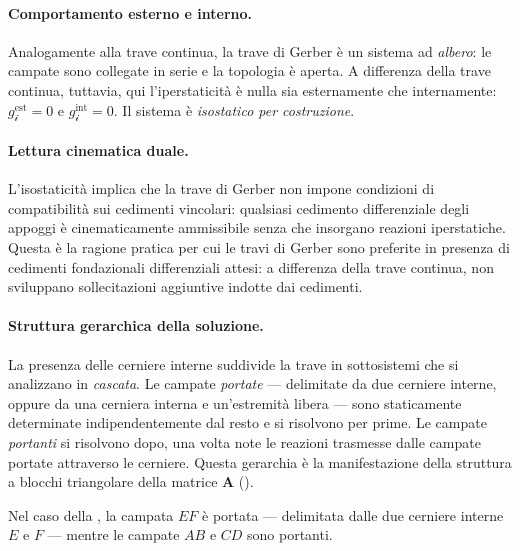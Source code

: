 




\paragraph{Comportamento esterno e interno.}
Analogamente alla trave continua, la trave di Gerber
è un sistema ad \emph{albero}: le campate sono
collegate in serie e la topologia è aperta.
A differenza della trave continua, tuttavia, qui
l'iperstaticità è nulla sia esternamente che
internamente: $g_{\mathscr{i}}^{\text{est}} = 0$
e $g_{\mathscr{i}}^{\text{int}} = 0$.
Il sistema è \emph{isostatico per costruzione}.

\paragraph{Lettura cinematica duale.}
L'isostaticità implica che la trave di Gerber non
impone condizioni di compatibilità sui cedimenti
vincolari: qualsiasi cedimento differenziale degli
appoggi è cinematicamente ammissibile senza che
insorgano reazioni iperstatiche.
Questa è la ragione pratica per cui le travi di
Gerber sono preferite in presenza di cedimenti
fondazionali differenziali attesi: a differenza
della trave continua, non sviluppano sollecitazioni
aggiuntive indotte dai cedimenti.

\paragraph{Struttura gerarchica della soluzione.}
La presenza delle cerniere interne suddivide la trave
in sottosistemi che si analizzano in \emph{cascata}.
Le campate \emph{portate} --- delimitate da due
cerniere interne, oppure da una cerniera interna e
un'estremità libera --- sono staticamente determinate
indipendentemente dal resto e si risolvono per prime.
Le campate \emph{portanti} si risolvono dopo, una
volta note le reazioni trasmesse dalle campate portate
attraverso le cerniere. Questa gerarchia è la
manifestazione della struttura a blocchi triangolare
della matrice $\bm{A}$
().

Nel caso della , la campata $EF$
è portata --- delimitata dalle due cerniere interne
$E$ e $F$ --- mentre le campate $AB$ e $CD$ sono
portanti.


